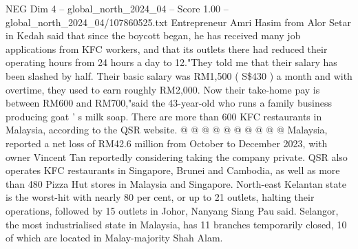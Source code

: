 \begin{textsample}{NEG Dim 4 – global\_north\_2024\_04 – Score 1.00 – global\_north\_2024\_04/107860525.txt}
Entrepreneur Amri Hasim from Alor Setar in Kedah said that since the boycott began, he has received many job applications from KFC workers, and that its outlets there had reduced their operating hours from 24 hours a day to 12."They told me that their salary has been slashed by half.
Their basic salary was RM1,500 ( S\$430 ) a month and with overtime, they used to earn roughly RM2,000.
Now their take-home pay is between RM600 and RM700,"said the 43-year-old who runs a family business producing goat ' s milk soap.
There are more than 600 KFC restaurants in Malaysia, according to the QSR website. @ @ @ @ @ @ @ @ @ @ Malaysia, reported a net loss of RM42.6 million from October to December 2023, with owner Vincent Tan reportedly considering taking the company private.
QSR also operates KFC restaurants in Singapore, Brunei and Cambodia, as well as more than 480 Pizza Hut stores in Malaysia and Singapore.
North-east Kelantan state is the worst-hit with nearly 80 per cent, or up to 21 outlets, halting their operations, followed by 15 outlets in Johor, Nanyang Siang Pau said.
Selangor, the most industrialised state in Malaysia, has 11 branches temporarily closed, 10 of which are located in Malay-majority Shah Alam.

\end{textsample}
